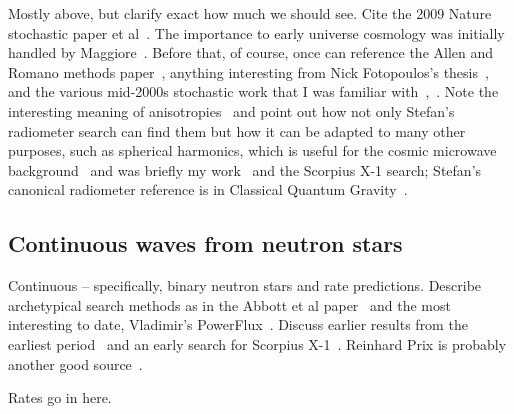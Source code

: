 		Mostly above, but clarify exact how much we should see. Cite the 2009 Nature stochastic paper et al~\cite{LIGOStochasticNature2009}. The importance to early universe cosmology was initially handled by Maggiore~\cite{Maggiore2000}. Before that, of course, once can reference the Allen and Romano methods paper~\cite{Allen1999}, anything interesting from Nick Fotopoulos's thesis~\cite{FotopoulosThesis}, and the various mid-2000s stochastic work that I was familiar with~\cite{Abbott2006},~\cite{Abbott2007}. Note the interesting meaning of anisotropies~\cite{Allen1997} and point out how not only Stefan's radiometer search can find them but how it can be adapted to many other purposes, such as spherical harmonics, which is useful for the cosmic microwave background~\cite{Muciaccia1997} and was briefly my work~\cite{MeadorsCaltech2007} and the Scorpius X-1 search; Stefan's canonical radiometer reference is in Classical Quantum Gravity~\cite{Radiometer2006}.

        \subsection{Continuous waves from neutron stars}
        \label{continuous_waves}

            Continuous -- specifically, binary neutron stars and rate predictions. Describe archetypical search methods as in the Abbott et al paper~\cite{LSCPulsar2006} and the most interesting to date, Vladimir's PowerFlux~\cite{LSCPowerFlux2009}. Discuss earlier results from the earliest period~\cite{Abbott2004} and an early search for Scorpius X-1~\cite{AbbottPulsar2006}. Reinhard Prix is probably another good source~\cite{Prix2006}.

		Rates go in here.

